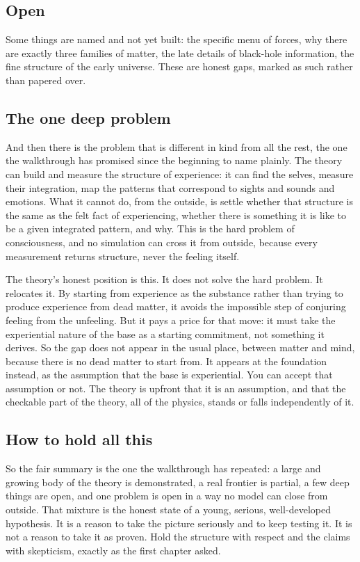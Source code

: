 \subsection{Open}

Some things are named and not yet built: the specific menu of forces, why there are exactly three families of matter, the late details of black-hole information, the fine structure of the early universe. These are honest gaps, marked as such rather than papered over.

\subsection{The one deep problem}

And then there is the problem that is different in kind from all the rest, the one the walkthrough has promised since the beginning to name plainly. The theory can build and measure the structure of experience: it can find the selves, measure their integration, map the patterns that correspond to sights and sounds and emotions. What it cannot do, from the outside, is settle whether that structure is the same as the felt fact of experiencing, whether there is something it is like to be a given integrated pattern, and why. This is the hard problem of consciousness, and no simulation can cross it from outside, because every measurement returns structure, never the feeling itself.

The theory's honest position is this. It does not solve the hard problem. It relocates it. By starting from experience as the substance rather than trying to produce experience from dead matter, it avoids the impossible step of conjuring feeling from the unfeeling. But it pays a price for that move: it must take the experiential nature of the base as a starting commitment, not something it derives. So the gap does not appear in the usual place, between matter and mind, because there is no dead matter to start from. It appears at the foundation instead, as the assumption that the base is experiential. You can accept that assumption or not. The theory is upfront that it is an assumption, and that the checkable part of the theory, all of the physics, stands or falls independently of it.

\subsection{How to hold all this}

So the fair summary is the one the walkthrough has repeated: a large and growing body of the theory is demonstrated, a real frontier is partial, a few deep things are open, and one problem is open in a way no model can close from outside. That mixture is the honest state of a young, serious, well-developed hypothesis. It is a reason to take the picture seriously and to keep testing it. It is not a reason to take it as proven. Hold the structure with respect and the claims with skepticism, exactly as the first chapter asked.

